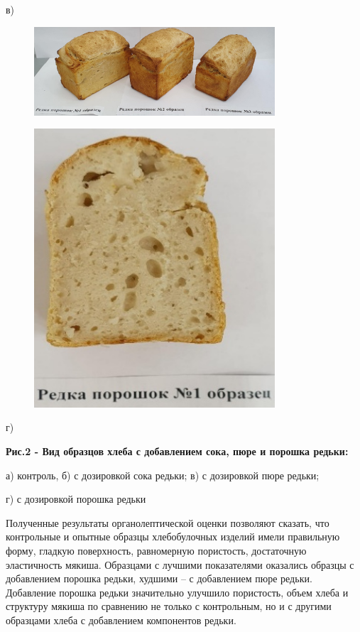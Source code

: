 в) 
\begin{figure}[H]
	\centering
	\includegraphics[width=0.8\textwidth]{media/pish/image67}
	\caption*{}
\end{figure}
\begin{figure}[H]
	\centering
	\includegraphics[width=0.8\textwidth]{media/pish/image68}
	\caption*{}
\end{figure}
г) 

{\bfseries Рис.2 - Вид образцов хлеба с добавлением сока, пюре и порошка редьки:}

а) контроль, б) с дозировкой сока редьки; в) с дозировкой пюре редьки;

г) с дозировкой порошка редьки

\begin{multicols}{2}
Полученные результаты органолептической оценки позволяют сказать, что
контрольные и опытные образцы хлебобулочных изделий имели правильную
форму, гладкую поверхность, равномерную пористость, достаточную
эластичность мякиша. Образцами с лучшими показателями оказались образцы
с добавлением порошка редьки, худшими -- с добавлением пюре редьки.
Добавление порошка редьки значительно улучшило пористость, объем хлеба и
структуру мякиша по сравнению не только с контрольным, но и с другими
образцами хлеба с добавлением компонентов редьки.
\end{multicols}


